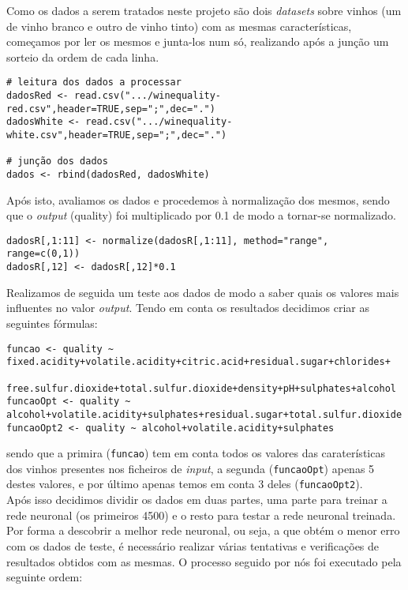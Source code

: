 \documentclass{article}
\begin{document}
Como os dados a serem tratados neste projeto são dois \textit{datasets} sobre vinhos (um de vinho branco e outro de vinho tinto) com as mesmas características, começamos por ler os mesmos e junta-los num só, realizando após a junção um sorteio da ordem de cada linha.

\begin{verbatim}
# leitura dos dados a processar
dadosRed <- read.csv(".../winequality-red.csv",header=TRUE,sep=";",dec=".")
dadosWhite <- read.csv(".../winequality-white.csv",header=TRUE,sep=";",dec=".")

# junção dos dados
dados <- rbind(dadosRed, dadosWhite)
\end{verbatim}

Após isto, avaliamos os dados e procedemos à normalização dos mesmos, sendo que o \textit{output} (quality) foi multiplicado por 0.1 de modo a tornar-se normalizado.

\begin{verbatim}
dadosR[,1:11] <- normalize(dadosR[,1:11], method="range", range=c(0,1))
dadosR[,12] <- dadosR[,12]*0.1
\end{verbatim}

Realizamos de seguida um teste aos dados de modo a saber quais os valores mais influentes no valor \textit{output}. Tendo em conta os resultados decidimos criar as seguintes fórmulas:

\begin{verbatim}
funcao <- quality ~ fixed.acidity+volatile.acidity+citric.acid+residual.sugar+chlorides+
                    free.sulfur.dioxide+total.sulfur.dioxide+density+pH+sulphates+alcohol
funcaoOpt <- quality ~ alcohol+volatile.acidity+sulphates+residual.sugar+total.sulfur.dioxide
funcaoOpt2 <- quality ~ alcohol+volatile.acidity+sulphates
\end{verbatim}

sendo que a primira (\texttt{funcao}) tem em conta todos os valores das caraterísticas dos vinhos presentes nos ficheiros de \textit{input}, a segunda (\texttt{funcaoOpt}) apenas 5 destes valores, e por último apenas temos em conta 3 deles (\texttt{funcaoOpt2}).\\
Após isso decidimos dividir os dados em duas partes, uma parte para treinar a rede neuronal (os primeiros 4500) e o resto para testar a rede neuronal treinada.
Por forma a descobrir a melhor rede neuronal, ou seja, a que obtém o menor erro com os dados de teste, é necessário realizar várias tentativas e verificações de resultados obtidos com as mesmas. O processo seguido por nós foi executado pela seguinte ordem:
\end{document}

